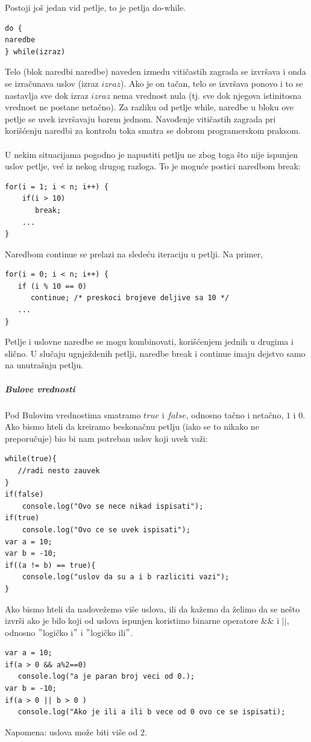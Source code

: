 \documentclass[a4paper]{article}
\begin{document}
Postoji još jedan vid petlje, to je petlja do-while.
\begin{lstlisting}[backgroundcolor = \color{lightgray}]
do {
naredbe
} while(izraz)
\end{lstlisting}
Telo (blok naredbi naredbe) naveden izmedu vitičastih
zagrada se izvršava i onda se izračunava uslov (izraz $izraz$).
Ako je on tačan, telo se izvršava ponovo i to se nastavlja sve
dok izraz $izraz$ nema vrednost nula (tj. sve dok njegova
istinitosna vrednost ne postane netačno).
Za razliku od petlje while, naredbe u bloku ove petlje se uvek
izvršavaju barem jednom. Navođenje vitičastih zagrada pri korišćenju naredbi za kontrolu toka smatra se dobrom programerskom praksom.\\\\

U nekim situacijama pogodno je napustiti petlju ne zbog toga
što nije ispunjen uslov petlje, već iz nekog drugog razloga. To
je moguće postici naredbom break:
\begin{lstlisting}[backgroundcolor = \color{lightgray}]
for(i = 1; i < n; i++) {
    if(i > 10)
       break;
    ...
}
\end{lstlisting}
Naredbom continue se prelazi na sledeću iteraciju u petlji.
Na primer,
\begin{lstlisting}[backgroundcolor = \color{lightgray}]
for(i = 0; i < n; i++) {
   if (i % 10 == 0)
      continue; /* preskoci brojeve deljive sa 10 */
   ...
}
\end{lstlisting}
Petlje i uslovne naredbe se mogu kombinovati, korišćenjem jednih u drugima i slično.
U slučaju ugnježdenih petlji, naredbe break i continue imaju
dejstvo samo na unutrašnju petlju.
\subparagraph{Bulove vrednosti}
Pod Bulovim vrednostima smatramo $true$ i $false$, odnosno tačno i netačno, $1$ i $0$. 
Ako bismo hteli da kreiramo beskonačnu petlju (iako se to nikako ne preporučuje) bio bi nam potreban uslov koji uvek važi:
\begin{lstlisting}[backgroundcolor = \color{lightgray}]
while(true){
   //radi nesto zauvek
}
if(false)
    console.log("Ovo se nece nikad ispisati");
if(true)
    console.log("Ovo ce se uvek ispisati");
var a = 10;
var b = -10;
if((a != b) == true){
    console.log("uslov da su a i b razliciti vazi");
}
\end{lstlisting}
Ako bismo hteli da nadovežemo više uslova, ili da kažemo da želimo da se nešto izvrši ako je bilo koji od uslova ispunjen koristimo binarne operatore $\&\&$ i $||$, odnosno $"$logičko i$"$ i $"$logičko ili$"$.
\begin{lstlisting}[backgroundcolor = \color{lightgray}]
var a = 10;
if(a > 0 && a%2==0)
   console.log("a je paran broj veci od 0.);
var b = -10;
if(a > 0 || b > 0 )
   console.log("Ako je ili a ili b vece od 0 ovo ce se ispisati);
\end{lstlisting}
Napomena: uslova može biti više od 2.
\end{document}
